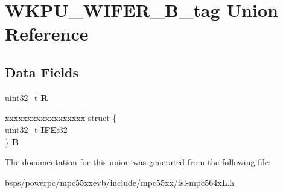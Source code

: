 \hypertarget{unionWKPU__WIFER__32B__tag}{}\section{W\+K\+P\+U\+\_\+\+W\+I\+F\+E\+R\+\_\+B\+\_\+tag Union Reference}
\label{unionWKPU__WIFER__32B__tag}
\subsection*{Data Fields}
\begin{DoxyCompactItemize}
\item 
\mbox{\label{unionWKPU__WIFER__32B__tag_aa1bddf9961685d975b81604b744bcf81}} 
uint32\+\_\+t {\bfseries R}
\item 
\mbox{\label{unionWKPU__WIFER__32B__tag_aff2fe21a22e73e2de9a1b76370e2405d}} 
\begin{tabbing}
xx\=xx\=xx\=xx\=xx\=xx\=xx\=xx\=xx\=\kill
struct \{\\
\>uint32\_t {\bfseries IFE}:32\\
\} {\bfseries B}\\

\end{tabbing}\end{DoxyCompactItemize}


The documentation for this union was generated from the following file\+:\begin{DoxyCompactItemize}
\item 
bsps/powerpc/mpc55xxevb/include/mpc55xx/fsl-\/mpc564x\+L.\+h\end{DoxyCompactItemize}
